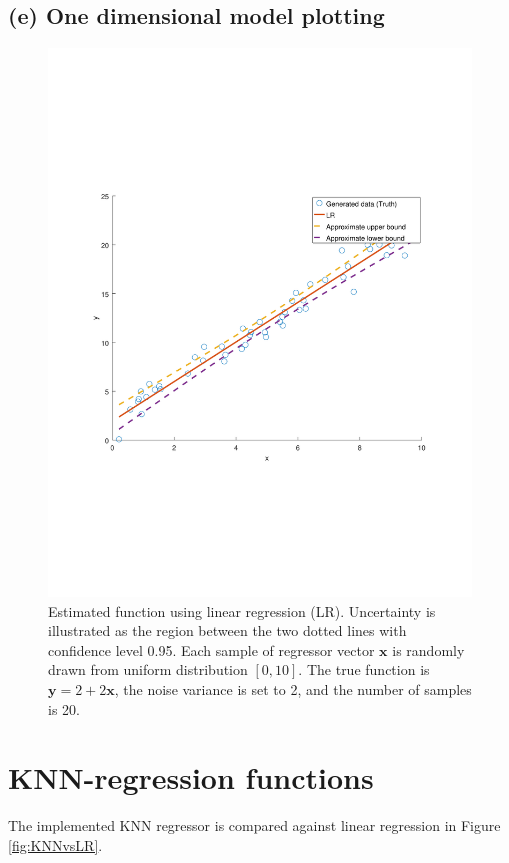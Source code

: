 \documentclass[]{article}
\begin{document}
\subsection{(e) One dimensional model plotting}
\begin{figure}[H]
	\centering
	\includegraphics[trim= 10cm 5cm 10cm 5cm, scale=0.4]{proj1-1e}
	\caption{Estimated function using linear regression (LR). Uncertainty is illustrated as the region between the two dotted lines with confidence level 0.95. Each sample of regressor vector $\mathbf{x}$ is randomly drawn from uniform distribution $[0,10]$. The true function is $\mathbf{y}=2+2\mathbf{x}$, the noise variance is set to 2, and the number of samples is 20. }
	\label{fig:confidence}
\end{figure}

\section{KNN-regression functions}
The implemented KNN regressor is compared against linear regression in Figure \ref{fig:KNNvsLR}.
\end{document}
